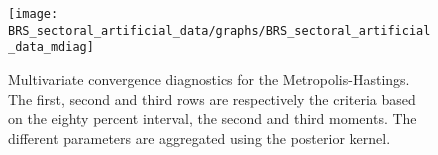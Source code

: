  
\begin{figure}[H]
\centering 
\texttt{[image: BRS\_sectoral\_artificial\_data/graphs/BRS\_sectoral\_artificial\_data\_mdiag]}
\caption{Multivariate convergence diagnostics for the Metropolis-Hastings.
The first, second and third rows are respectively the criteria based on
the eighty percent interval, the second and third moments. The different 
parameters are aggregated using the posterior kernel.}\label{Fig:MultivariateDiagnostics}
\end{figure}

